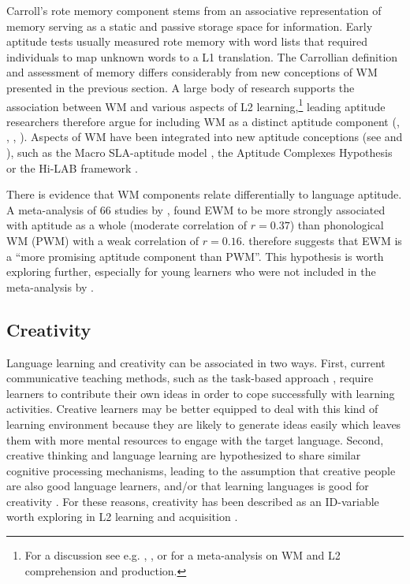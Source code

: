 \documentclass[output=paper]{langscibook}
\begin{document}
Carroll’s rote memory component stems from an associative representation of memory serving as a static and passive storage space for information. Early aptitude tests usually measured rote memory with word lists that required individuals to map unknown words to a L1 translation. The Carrollian definition and assessment of memory differs considerably from new conceptions of WM presented in the previous section. A large body of research supports the association between WM and various aspects of L2 learning,\footnote{For a discussion see e.g. \citet{DeKeyserKoeth2011}, \citet{Wen2015}, or \citet{LinckEtAl2014} for a meta-analysis on WM and L2 comprehension and production.} leading aptitude researchers therefore argue for including WM as a distinct aptitude component (\citealt{MiyakeFriedman1998}, \citealt{DeKeyserKoeth2011}, \citealt{Robinson2002}, \citealt{Skehan2019}). Aspects of WM have been integrated into new aptitude conceptions (see  and ), such as the Macro SLA-aptitude model \citep{Skehan2019}, the Aptitude Complexes Hypothesis \citep{Robinson2002} or the Hi-LAB framework \citep{LinckEtAl2013}. 

There is evidence that WM components relate differentially to language aptitude. A meta-analysis of 66 studies by \citet{Li2016}, found EWM to be more strongly associated with aptitude as a whole (moderate correlation of $r=0.37$) than phonological WM (PWM) with a weak correlation of $r=0.16$. \citet[828]{Li2016} therefore suggests that EWM is a “more promising aptitude component than PWM”. This hypothesis is worth exploring further, especially for young learners who were not included in the meta-analysis by \citet{Li2016}. 

\subsection{Creativity} %

Language learning and creativity can be associated in two ways. First, current communicative teaching methods, such as the task-based approach \citep{Willis1996}, require learners to contribute their own ideas in order to cope successfully with learning activities. Creative learners may be better equipped to deal with this kind of learning environment because they are likely to generate ideas easily which leaves them with more mental resources to engage with the target language. Second, creative thinking and language learning are hypothesized to share similar cognitive processing mechanisms, leading to the assumption that creative people are also good language learners, and/or that learning languages is good for creativity \citep{Kharkhurin2012}. For these reasons, creativity has been described as an ID-variable worth exploring in L2 learning and acquisition \citep{DoernyeiRyan2015}. 
\end{document}
